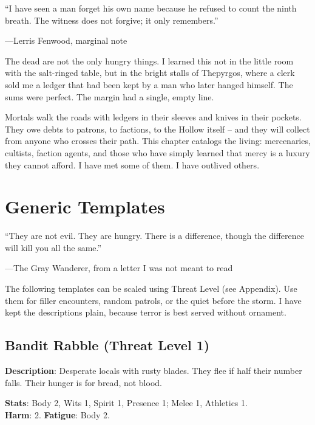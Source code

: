
\epigraph{``I have seen a man forget his own name because he refused to count the ninth breath. The witness does not forgive; it only remembers.''}{---Lerris Fenwood, marginal note}

The dead are not the only hungry things. I learned this not in the little room with the salt-ringed table, but in the bright stalls of Thepyrgos, where a clerk sold me a ledger that had been kept by a man who later hanged himself. The sums were perfect. The margin had a single, empty line.

Mortals walk the roads with ledgers in their sleeves and knives in their pockets. They owe debts to patrons, to factions, to the Hollow itself -- and they will collect from anyone who crosses their path. This chapter catalogs the living: mercenaries, cultists, faction agents, and those who have simply learned that mercy is a luxury they cannot afford. I have met some of them. I have outlived others.

\section*{Generic Templates}
\epigraph{``They are not evil. They are hungry. There is a difference, though the difference will kill you all the same.''}{---The Gray Wanderer, from a letter I was not meant to read}

The following templates can be scaled using Threat Level (see Appendix). Use them for filler encounters, random patrols, or the quiet before the storm. I have kept the descriptions plain, because terror is best served without ornament.

\subsection*{Bandit Rabble (Threat Level 1)}

\noindent\textbf{Description}: Desperate locals with rusty blades. They flee if half their number falls. Their hunger is for bread, not blood.

\noindent\textbf{Stats}: Body 2, Wits 1, Spirit 1, Presence 1; Melee 1, Athletics 1.\\
\textbf{Harm}: 2. \textbf{Fatigue}: Body 2.

